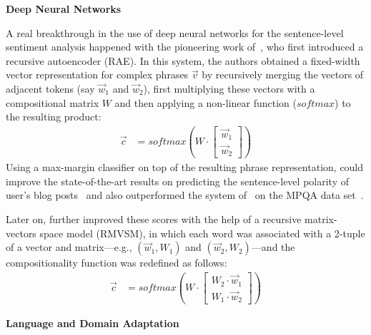 \textbf{Deep Neural Networks}

\citet{Yessenalina:11}

A real breakthrough in the use of deep neural networks for the
sentence-level sentiment analysis happened with the pioneering work
of~\citet{Socher:11}, who first introduced a recursive autoencoder
(RAE).  In this system, the authors obtained a fixed-width vector
representation for complex phrases $\vec{v}$ by recursively merging
the vectors of adjacent tokens (say $\vec{w}_1$ and $\vec{w}_2$),
first multiplying these vectors with a compositional matrix $W$ and
then applying a non-linear function ($softmax$) to the resulting
product:
\begin{align*}
  \vec{c} &= softmax\left(W\cdot\begin{bmatrix}
  \vec{w}_1\\
  \vec{w}_2
  \end{bmatrix}\right)
\end{align*}
Using a max-margin classifier on top of the resulting phrase
representation, \citet{Socher:11} could improve the state-of-the-art
results on predicting the sentence-level polarity of user's blog
posts~\cite{Potts:10} and also outperformed the system
of~\citet{Nasukawa:03} on the MPQA data set~\cite{Wiebe:05}.

Later on, \citet{Socher:12} further improved these scores with the
help of a recursive matrix-vectors space model (RMVSM), in which each
word was associated with a 2-tuple of a vector and matrix---e.g.,
$(\vec{w}_1, W_1)$ and $(\vec{w}_2, W_2)$---and the compositionality
function was redefined as follows:
\begin{align*}
  \vec{c} &= softmax\left(W\cdot\begin{bmatrix}
  W_2\cdot\vec{w}_1\\
  W_1\cdot\vec{w}_2
  \end{bmatrix}\right)
\end{align*}

\citet{Wang:15}

\textbf{Language and Domain Adaptation}

